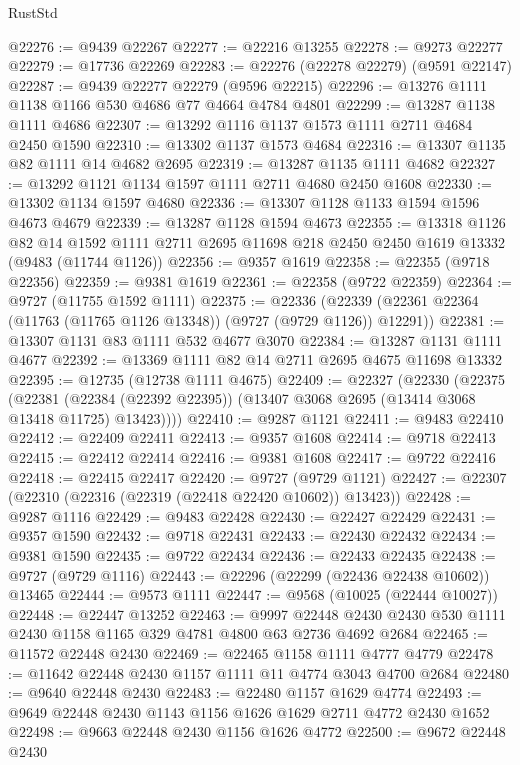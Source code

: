 \begin{lexlean}{RustStd}
\begin{coremodule}
{\begin{coremodule}
{{{{{{{{{{{{{{{{{{{{{{{{{{{{{{{{{{{{{{{{{{{{{{{{{{{{{{{@22276 := @9439 @22267
@22277 := @22216 @13255
@22278 := @9273 @22277
@22279 := @17736 @22269
@22283 := @22276 (@22278 @22279) (@9591 @22147)
@22287 := @9439 @22277 @22279 (@9596 @22215)
@22296 := @13276 @1111 @1138 @1166 @530 @4686 @77 @4664 @4784 @4801
@22299 := @13287 @1138 @1111 @4686
@22307 := @13292 @1116 @1137 @1573 @1111 @2711 @4684 @2450 @1590
@22310 := @13302 @1137 @1573 @4684
@22316 := @13307 @1135 @82 @1111 @14 @4682 @2695
@22319 := @13287 @1135 @1111 @4682
@22327 := @13292 @1121 @1134 @1597 @1111 @2711 @4680 @2450 @1608
@22330 := @13302 @1134 @1597 @4680
@22336 := @13307 @1128 @1133 @1594 @1596 @4673 @4679
@22339 := @13287 @1128 @1594 @4673
@22355 := @13318
    @1126
    @82
    @14
    @1592
    @1111
    @2711
    @2695
    @11698
    @218
    @2450
    @2450
    @1619
    @13332
    (@9483 (@11744 @1126))
@22356 := @9357 @1619
@22358 := @22355 (@9718 @22356)
@22359 := @9381 @1619
@22361 := @22358 (@9722 @22359)
@22364 := @9727 (@11755 @1592 @1111)
@22375 := @22336
    (@22339 (@22361 @22364 (@11763 (@11765 @1126 @13348)) (@9727 (@9729 @1126)) @12291))
@22381 := @13307 @1131 @83 @1111 @532 @4677 @3070
@22384 := @13287 @1131 @1111 @4677
@22392 := @13369 @1111 @82 @14 @2711 @2695 @4675 @11698 @13332
@22395 := @12735 (@12738 @1111 @4675)
@22409 := @22327
    (@22330
      (@22375
        (@22381 (@22384 (@22392 @22395)) (@13407 @3068 @2695 (@13414 @3068 @13418 @11725) @13423))))
@22410 := @9287 @1121
@22411 := @9483 @22410
@22412 := @22409 @22411
@22413 := @9357 @1608
@22414 := @9718 @22413
@22415 := @22412 @22414
@22416 := @9381 @1608
@22417 := @9722 @22416
@22418 := @22415 @22417
@22420 := @9727 (@9729 @1121)
@22427 := @22307 (@22310 (@22316 (@22319 (@22418 @22420 @10602)) @13423))
@22428 := @9287 @1116
@22429 := @9483 @22428
@22430 := @22427 @22429
@22431 := @9357 @1590
@22432 := @9718 @22431
@22433 := @22430 @22432
@22434 := @9381 @1590
@22435 := @9722 @22434
@22436 := @22433 @22435
@22438 := @9727 (@9729 @1116)
@22443 := @22296 (@22299 (@22436 @22438 @10602)) @13465
@22444 := @9573 @1111
@22447 := @9568 (@10025 (@22444 @10027))
@22448 := @22447 @13252
@22463 := @9997
    @22448
    @2430
    @2430
    @530
    @1111
    @2430
    @1158
    @1165
    @329
    @4781
    @4800
    @63
    @2736
    @4692
    @2684
@22465 := @11572 @22448 @2430
@22469 := @22465 @1158 @1111 @4777 @4779
@22478 := @11642 @22448 @2430 @1157 @1111 @11 @4774 @3043 @4700 @2684
@22480 := @9640 @22448 @2430
@22483 := @22480 @1157 @1629 @4774
@22493 := @9649 @22448 @2430 @1143 @1156 @1626 @1629 @2711 @4772 @2430 @1652
@22498 := @9663 @22448 @2430 @1156 @1626 @4772
@22500 := @9672 @22448 @2430
}}}}}}}}}}}}}}}}}}}}}}}}}}}}}}}}}}}}}}}}}}}}}}}}}}}}}}}
\end{coremodule}}
\end{coremodule}
\end{lexlean}

